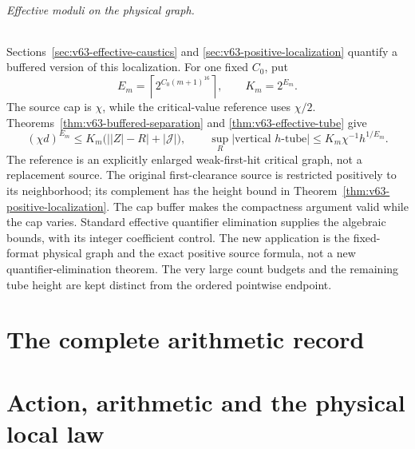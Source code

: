 \documentclass[11pt,reqno]{amsart}
\numberwithin{equation}{section}
\theoremstyle{definition}\newtheorem{definition}[theorem]{Definition}
\theoremstyle{remark}\newtheorem{remark}[theorem]{Remark}
\begin{document}
\paragraph{Effective moduli on the physical graph.}
Sections~\ref{sec:v63-effective-caustics} and
\ref{sec:v63-positive-localization} quantify a buffered version of
this localization. For one fixed $C_0$, put
\[
 E_m=\left\lceil2^{C_0(m+1)^{16}}\right\rceil,\qquad K_m=2^{E_m}.
\]
The source cap is $\chi$, while the critical-value reference uses
$\chi/2$. Theorems~\ref{thm:v63-buffered-separation} and
\ref{thm:v63-effective-tube} give
\[
 (\chi d)^{E_m}\le K_m\bigl(\bigl||Z|-R\bigr|+|\mathcal J|\bigr),
 \qquad \sup_R|\text{vertical }h\text{-tube}|
                  \le K_m\chi^{-1}h^{1/E_m}.
\]
The reference is an explicitly enlarged weak-first-hit critical graph,
not a replacement source. The original first-clearance source is
restricted positively to its neighborhood; its complement has the
height bound in Theorem~\ref{thm:v63-positive-localization}. The cap
buffer makes the compactness argument valid while the cap varies.
Standard effective quantifier elimination supplies the algebraic
bounds, with its integer coefficient control. The new application is
the fixed-format physical graph and the exact positive source formula,
not a new quantifier-elimination theorem. The very large count budgets
and the remaining tube height are kept distinct from the ordered
pointwise endpoint.

\part{The complete arithmetic record}
















\part{Action, arithmetic and the physical local law}









\end{document}
